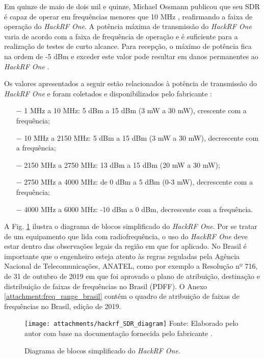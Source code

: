 \documentclass[
  12pt,				%
  openright,			%
  twoside,			%
  a4paper,			%
  english,			%
  french,				%
  spanish,			%
  brazil,				%
  ]{abntex2}
\begin{document}
Em quinze de maio de dois mil e quinze, Michael Ossmann publicou que seu SDR é capaz de operar em frequências menores que 10 MHz \cite{HACKRF-1mhz}, reafirmando a faixa de operação do \textit{HackRF One}.
A potência máxima de transmissão do \textit{HackRF One} varia de acordo com a faixa de frequência de operação e é suficiente para a realização de testes de curto alcance. Para recepção, o máximo de
potência fica na ordem de -5 dBm e exceder este valor pode resultar em danos permanentes ao \textit{HackRF One} \cite{HACKRF-hardware-receive-power}.

Os valores apresentados a seguir estão relacionados à potência de transmissão do \textit{HackRF One} e foram coletados e disponibilizados pelo fabricante \cite{HACKRF-hardware-transmit-power}:

\begin{itemize}
  \item[$-$] 1 MHz a 10 MHz: 5 dBm a 15 dBm (3 mW a 30 mW), crescente com a frequência;
  \item[$-$] 10 MHz a 2150 MHz: 5 dBm a 15 dBm (3 mW a 30 mW), decrescente com a frequência;
  \item[$-$] 2150 MHz a 2750 MHz: 13 dBm a 15 dBm (20 mW a 30 mW);
  \item[$-$] 2750 MHz a 4000 MHz: de 0 dBm a 5 dBm (0-3 mW), decrescente com a frequência;
  \item[$-$] 4000 MHz a 6000 MHz: -10 dBm a 0 dBm, decrescente com a frequência.
\end{itemize}

A Fig. \ref{fig:hackrf_block_diagram} ilustra o diagrama de blocos simplificado do \textit{HackRF One}. Por se tratar de um equipamento que lida com radiofrequência, o uso do \textit{HackRF One} deve estar dentro das observações legais da região em que for aplicado. No Brasil é importante que o
engenheiro esteja atento às regras reguladas pela Agência Nacional de Telecomunicações, ANATEL, como por exemplo a Resolução nº 716, de 31 de outubro de 2019 em que foi aprovado o plano de
atribuição, destinação e distribuição de faixas de frequências no Brasil (PDFF). O Anexo \ref{attachment:freq_range_brasil} contém o quadro de atribuição de faixas de frequências no Brasil, edição de 2019.

\begin{figure}[!htb]
  \centering
  \caption{Diagrama de blocos simplificado do \textit{HackRF One}.}
  \texttt{[image: attachments/hackrf\_SDR\_diagram]}
  Fonte: Elaborado pelo autor com base na documentação fornecida pelo fabricante \cite{HACKRF-hardware-components}.
  \label{fig:hackrf_block_diagram}
\end{figure}
\end{document}
